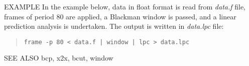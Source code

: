 \begin{options}
\end{options}


\begin{qsection}{EXAMPLE}
In the example below, data in float format is read from {\em data.f} file,
frames of period 80 are applied, a Blackman window is passed, and
a linear prediction analysis is undertaken. The output is written in
{\em data.lpc} file:
\begin{quote}
 \verb!frame -p 80 < data.f | window | lpc > data.lpc!
\end{quote} 
\end{qsection}

\begin{qsection}{SEE ALSO}
 bcp, x2x, bcut, window
\end{qsection}
